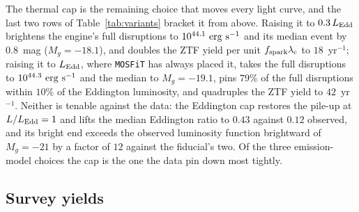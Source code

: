 \documentclass[twocolumn,pdftex]{aastex701}
\newcommand{\mosfit}{{\tt MOSFiT}\xspace}
\newcommand{\fspark}{f_{\rm spark}\xspace}
\newcommand{\lamc}{\lambda_{\rm c}\xspace}
\begin{document}
The thermal cap is the remaining choice that moves every light curve, and the last two rows of Table~\ref{tab:variants} bracket it from above. Raising it to $0.3\, L_{\rm Edd}$ brightens the engine's full disruptions to $10^{44.1}~{\rm erg~s^{-1}}$ and its median event by $0.8$~mag ($M_g = -18.1$), and doubles the ZTF yield per unit $\fspark \lamc$ to $18$~yr$^{-1}$; raising it to $L_{\rm Edd}$, where \mosfit has always placed it, takes the full disruptions to $10^{44.3}~{\rm erg~s^{-1}}$ and the median to $M_g = -19.1$, pins $79\%$ of the full disruptions within $10\%$ of the Eddington luminosity, and quadruples the ZTF yield to $42$~yr$^{-1}$. Neither is tenable against the data: the Eddington cap restores the pile-up at $L/L_{\rm Edd} = 1$ and lifts the median Eddington ratio to $0.43$ against $0.12$ observed, and its bright end exceeds the observed luminosity function brightward of $M_g = -21$ by a factor of $12$ against the fiducial's two. Of the three emission-model choices the cap is the one the data pin down most tightly.

\subsection{Survey yields}\label{subsec:yields}
\end{document}
